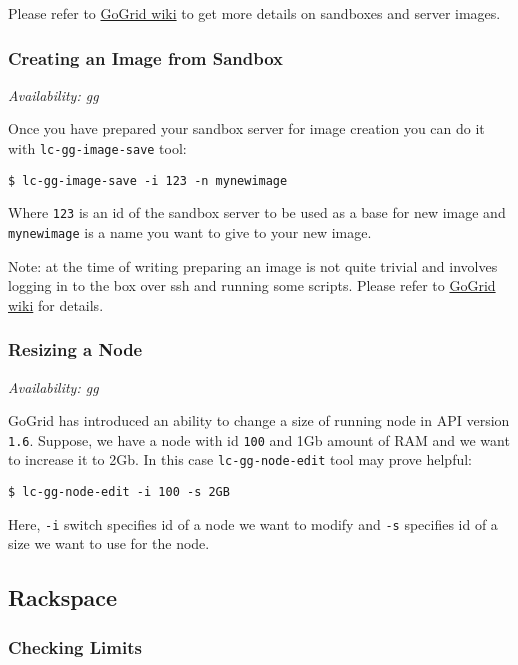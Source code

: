\documentclass[a4paper]{report}
\begin{document}
Please refer to \href{http://wiki.gogrid.com/wiki/index.php/MyGSI}{GoGrid wiki} to get
more details on sandboxes and server images.

\subsubsection{Creating an Image from Sandbox}

\textit{Availability: gg}

Once you have prepared your sandbox server for image creation you can do it with
\texttt{lc-gg-image-save} tool:

\begin{verbatim}
$ lc-gg-image-save -i 123 -n mynewimage
\end{verbatim}

Where \texttt{123} is an id of the sandbox server to be used as a base for new image and
\texttt{mynewimage} is a name you want to give to your new image.

Note: at the time of writing preparing an image is not quite trivial and involves logging in
to the box over ssh and running some scripts. Please refer to 
\href{http://wiki.gogrid.com/wiki/index.php/MyGSI}{GoGrid wiki} for details.

\subsubsection{Resizing a Node}

\textit{Availability: gg}

GoGrid has introduced an ability to change a size of running node in API version \texttt{1.6}.
Suppose, we have a node with id \texttt{100} and 1Gb amount of RAM and we want to increase it
to 2Gb. In this case \texttt{lc-gg-node-edit} tool may prove helpful:

\begin{verbatim}
$ lc-gg-node-edit -i 100 -s 2GB
\end{verbatim}

Here, \texttt{-i} switch specifies id of a node we want to modify and \texttt{-s} specifies
id of a size we want to use for the node.

\subsection{Rackspace}

\subsubsection{Checking Limits}
\end{document}
